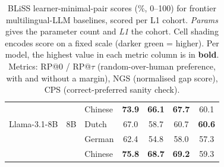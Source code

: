 \documentclass[11pt]{article}
\begin{document}
\begin{table}[!ht]
\begin{tabular}{ll l cccc}
 &  & Chinese & \cellcolor[rgb]{0.751,1.000,0.751} \textbf{73.9} & \cellcolor[rgb]{0.797,1.000,0.797} \textbf{66.1} & \cellcolor[rgb]{0.766,1.000,0.766} \textbf{67.7} & \cellcolor[rgb]{0.793,1.000,0.793} 60.1 \\
\addlinespace[2pt]
Llama-3.1-8B & 8B & Dutch & \cellcolor[rgb]{0.823,1.000,0.823} 67.0 & \cellcolor[rgb]{0.890,1.000,0.890} 58.7 & \cellcolor[rgb]{0.858,1.000,0.858} 60.7 & \cellcolor[rgb]{0.783,1.000,0.783} \textbf{60.6} \\
 &  & German & \cellcolor[rgb]{0.871,1.000,0.871} 62.4 & \cellcolor[rgb]{0.939,1.000,0.939} 54.8 & \cellcolor[rgb]{0.894,1.000,0.894} 58.0 & \cellcolor[rgb]{0.851,1.000,0.851} 57.3 \\
 &  & Chinese & \cellcolor[rgb]{0.731,1.000,0.731} \textbf{75.8} & \cellcolor[rgb]{0.764,1.000,0.764} \textbf{68.7} & \cellcolor[rgb]{0.746,1.000,0.746} \textbf{69.2} & \cellcolor[rgb]{0.810,1.000,0.810} 59.3 \\
\bottomrule
\end{tabular}
\caption{BLiSS learner-minimal-pair scores (\%, 0--100) for frontier
multilingual-LLM baselines, scored per L1 cohort. \emph{Params} gives the
parameter count and \emph{L1} the cohort. Cell shading encodes score on a
fixed scale (darker green = higher). Per model, the highest value in each
metric column is in \textbf{bold}. Metrics: RP@0 / RP@$\tau$
(random-over-human preference, with and without a margin), NGS (normalised
gap score), CPS (correct-preferred sanity check).}
\label{tab:bliss_baselines}
\end{table}


\clearpage
\end{document}
